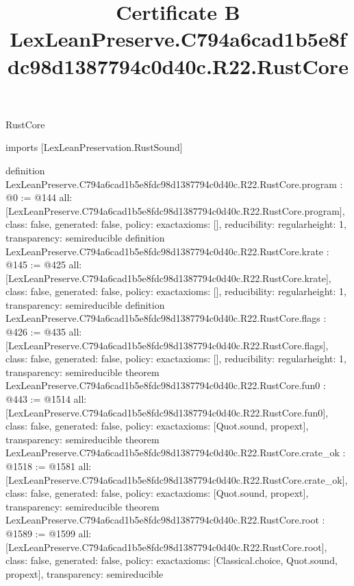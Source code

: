 \begin{lexlean}{RustCore}
\title{Certificate B LexLeanPreserve.C794a6cad1b5e8fdc98d1387794c0d40c.R22.RustCore}
\begin{coremodule}
imports [LexLeanPreservation.RustSound]

definition LexLeanPreserve.C794a6cad1b5e8fdc98d1387794c0d40c.R22.RustCore.program : @0 := @144 {
  all: [LexLeanPreserve.C794a6cad1b5e8fdc98d1387794c0d40c.R22.RustCore.program],
  class: false,
  generated: false,
  policy: exact{axioms: []},
  reducibility: regular{height: 1},
  transparency: semireducible
}
definition LexLeanPreserve.C794a6cad1b5e8fdc98d1387794c0d40c.R22.RustCore.krate : @145 := @425 {
  all: [LexLeanPreserve.C794a6cad1b5e8fdc98d1387794c0d40c.R22.RustCore.krate],
  class: false,
  generated: false,
  policy: exact{axioms: []},
  reducibility: regular{height: 1},
  transparency: semireducible
}
definition LexLeanPreserve.C794a6cad1b5e8fdc98d1387794c0d40c.R22.RustCore.flags : @426 := @435 {
  all: [LexLeanPreserve.C794a6cad1b5e8fdc98d1387794c0d40c.R22.RustCore.flags],
  class: false,
  generated: false,
  policy: exact{axioms: []},
  reducibility: regular{height: 1},
  transparency: semireducible
}
theorem LexLeanPreserve.C794a6cad1b5e8fdc98d1387794c0d40c.R22.RustCore.fun0 : @443 := @1514 {
  all: [LexLeanPreserve.C794a6cad1b5e8fdc98d1387794c0d40c.R22.RustCore.fun0],
  class: false,
  generated: false,
  policy: exact{axioms: [Quot.sound, propext]},
  transparency: semireducible
}
theorem LexLeanPreserve.C794a6cad1b5e8fdc98d1387794c0d40c.R22.RustCore.crate_ok : @1518 := @1581 {
  all: [LexLeanPreserve.C794a6cad1b5e8fdc98d1387794c0d40c.R22.RustCore.crate_ok],
  class: false,
  generated: false,
  policy: exact{axioms: [Quot.sound, propext]},
  transparency: semireducible
}
theorem LexLeanPreserve.C794a6cad1b5e8fdc98d1387794c0d40c.R22.RustCore.root : @1589 := @1599 {
  all: [LexLeanPreserve.C794a6cad1b5e8fdc98d1387794c0d40c.R22.RustCore.root],
  class: false,
  generated: false,
  policy: exact{axioms: [Classical.choice, Quot.sound, propext]},
  transparency: semireducible
}


\end{coremodule}
\end{lexlean}
